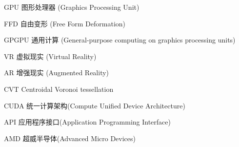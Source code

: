 \begin{denotation}

\item[GPU] 图形处理器 (Graphics Processing Unit)
\item[FFD] 自由变形 (Free Form Deformation)
\item[GPGPU] 通用计算 (General-purpose computing on graphics processing units)
\item[VR] 虚拟现实 (Virtual Reality)
\item[AR] 增强现实 (Augmented Reality)
\item[CVT] Centroidal Voronoi tessellation
\item[CUDA] 统一计算架构(Compute Unified Device Architecture)
\item[API] 应用程序接口(Application Programming Interface)
\item[AMD] 超威半导体(Advanced Micro Devices)



\end{denotation}
